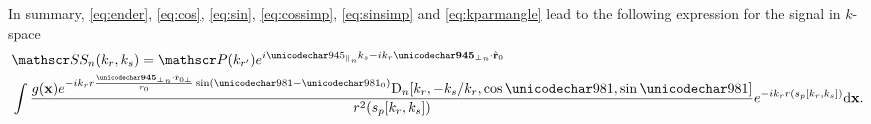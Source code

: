 \par
In summary, \eqref{eq:ender}, \eqref{eq:cos}, \eqref{eq:sin}, \eqref{eq:cossimp}, \eqref{eq:sinsimp} and \eqref{eq:kparmangle} lead to the following expression for the signal in $k$-space
% 
\begin{equation}
\begin{split}
 &\SkSf{\channelIndex}(\kr,\kparm)=\Snvelope(\krc)\eex{\im\alongtrack\kparm-\im\kr\acrosstrack\cdot\uRangeVectorParmZero}\\
 &\int\frac{\reflectivity(\targetnoparm)\eex{-\im\kr\targetrange\frac{\acrosstrack\cdot\uRangeVectorParmZeroPerp}{\targetrangez}\sin(\targetdepression-\targetdepressionz)}\dPattern{\channelIndex}[\kr, -\kparm/\kr, \cos\targetdepression, \sin\targetdepression]}{\amplitude\range^2(\stationaryparm[\kr,\kparm])}\eex{-\im\kr\amplitude\range(\stationaryparm[\kr,\kparm])}\d\targetnoparm.
 \end{split}
\end{equation}
